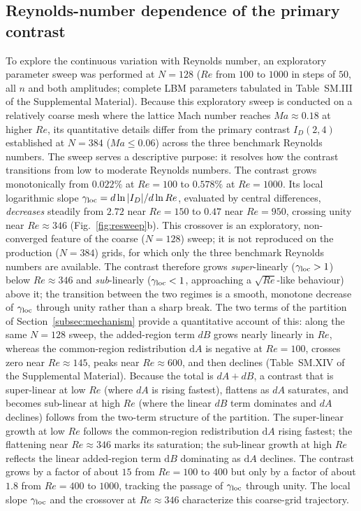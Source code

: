 \subsection{Reynolds-number dependence of the primary contrast}
\label{subsec:redependence}

To explore the continuous variation with Reynolds number, an exploratory parameter sweep was performed at $N=128$ ($Re$ from $100$ to $1000$ in steps of $50$, all $n$ and both amplitudes; complete LBM parameters tabulated in Table~SM.III of the Supplemental Material). Because this exploratory sweep is conducted on a relatively coarse mesh where the lattice Mach number reaches $Ma\approx0.18$ at higher $Re$, its quantitative details differ from the primary contrast $I_D(2,4)$ established at $N=384$ ($Ma\le0.06$) across the three benchmark Reynolds numbers. The sweep serves a descriptive purpose: it resolves how the contrast transitions from low to moderate Reynolds numbers. The contrast grows monotonically from $0.022\%$ at $Re=100$ to $0.578\%$ at $Re=1000$. Its local logarithmic slope $\gamma_{\rm loc}=d\ln|I_D|/d\ln Re$, evaluated by central differences, \emph{decreases} steadily from $2.72$ near $Re=150$ to $0.47$ near $Re=950$, crossing unity near $Re\approx346$ (Fig.~\ref{fig:resweep}b). This crossover is an exploratory, non-converged feature of the coarse ($N=128$) sweep; it is not reproduced on the production ($N=384$) grids, for which only the three benchmark Reynolds numbers are available. The contrast therefore grows \emph{super}-linearly ($\gamma_{\rm loc}>1$) below $Re\approx346$ and \emph{sub}-linearly ($\gamma_{\rm loc}<1$, approaching a $\sqrt{Re}$-like behaviour) above it; the transition between the two regimes is a smooth, monotone decrease of $\gamma_{\rm loc}$ through unity rather than a sharp break. The two terms of the partition of Section~\ref{subsec:mechanism} provide a quantitative account of this: along the same $N=128$ sweep, the added-region term $dB$ grows nearly linearly in $Re$, whereas the common-region redistribution $\mathrm{d}A$ is negative at $Re=100$, crosses zero near $Re\approx145$, peaks near $Re\approx600$, and then declines (Table~SM.XIV of the Supplemental Material). Because the total is $dA+dB$, a contrast that is super-linear at low $Re$ (where $dA$ is rising fastest), flattens as $dA$ saturates, and becomes sub-linear at high $Re$ (where the linear $dB$ term dominates and $dA$ declines) follows from the two-term structure of the partition. The super-linear growth at low $Re$ follows the common-region redistribution $\mathrm{d}A$ rising fastest; the flattening near $Re\approx346$ marks its saturation; the sub-linear growth at high $Re$ reflects the linear added-region term $\mathrm{d}B$ dominating as $\mathrm{d}A$ declines. The contrast grows by a factor of about $15$ from $Re=100$ to $400$ but only by a factor of about $1.8$ from $Re=400$ to $1000$, tracking the passage of $\gamma_{\rm loc}$ through unity. The local slope $\gamma_{\rm loc}$ and the crossover at $Re\approx346$ characterize this coarse-grid trajectory.

